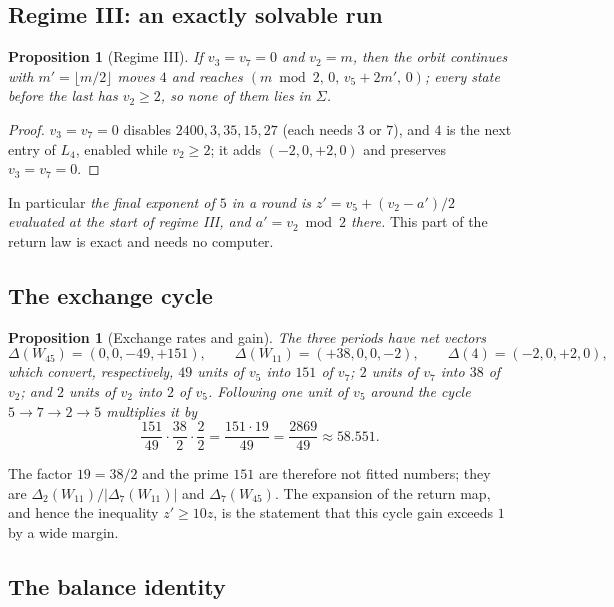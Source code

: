 \documentclass[11pt,a4paper]{article}
\newtheorem{proposition}[theorem]{Proposition}
\theoremstyle{definition}
\newcommand{\Sig}{\Sigma}
\newcommand{\Wa}{W_{45}}
\newcommand{\Wb}{W_{11}}
\begin{document}
\subsection{Regime III: an exactly solvable run}

\begin{proposition}[Regime III]\label{prop:reg3}
If $v_3=v_7=0$ and $v_2=m$, then the orbit continues with $m'=\lfloor m/2\rfloor$ moves $4$ and reaches $(m\bmod 2,\,0,\,v_5+2m',\,0)$; every state before the last has $v_2\ge2$, so none of them lies in $\Sig$.
\end{proposition}
\begin{proof}
$v_3=v_7=0$ disables $2400,3,35,15,27$ (each needs $3$ or $7$), and $4$ is the next entry of $L_4$, enabled while $v_2\ge2$; it adds $(-2,0,+2,0)$ and preserves $v_3=v_7=0$.
\end{proof}

In particular \emph{the final exponent of $5$ in a round is $z'=v_5+(v_2-a')/2$ evaluated at the start of regime III, and $a'=v_2\bmod2$ there.} This part of the return law is exact and needs no computer.

\subsection{The exchange cycle}

\begin{proposition}[Exchange rates and gain]\label{prop:exchange}
The three periods have net vectors
\[
\Delta(\Wa)=(0,0,-49,+151),\qquad \Delta(\Wb)=(+38,0,0,-2),\qquad \Delta(4)=(-2,0,+2,0),
\]
which convert, respectively, $49$ units of $v_5$ into $151$ of $v_7$; $2$ units of $v_7$ into $38$ of $v_2$; and $2$ units of $v_2$ into $2$ of $v_5$. Following one unit of $v_5$ around the cycle $5\to7\to2\to5$ multiplies it by
\[
\frac{151}{49}\cdot\frac{38}{2}\cdot\frac{2}{2}=\frac{151\cdot19}{49}=\frac{2869}{49}\approx58.551 .
\]
\end{proposition}

\noindent The factor $19=38/2$ and the prime $151$ are therefore not fitted numbers; they are $\Delta_2(\Wb)/|\Delta_7(\Wb)|$ and $\Delta_7(\Wa)$. The expansion of the return map, and hence the inequality $z'\ge10z$, is the statement that this cycle gain exceeds $1$ by a wide margin.

\subsection{The balance identity}\label{subsec:balance}
\end{document}
